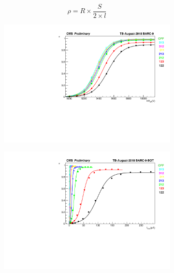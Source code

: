 	\begin{equation}
	\label{eq:resistivity}
	\rho = R \times \frac{S}{2 \times l}
	\end{equation}
	
\begingroup\setlength{\intextsep}{0pt}\setlength{\columnsep}{15pt}
	
	\begin{figure}
    	\begin{subfigure}{\linewidth}
			\centering
    		\includegraphics[width = \linewidth]{fig/chapt5/HVeff-Graph-BARC-9.pdf}
        	\caption{\label{fig:august-sig:A}}
    	\end{subfigure}
    	\begin{subfigure}{\linewidth}
			\centering
    		\includegraphics[width = \linewidth]{fig/chapt5/Imon-Graph-BARC-9-BOT.pdf}

\end{subfigure}
\end{figure}
